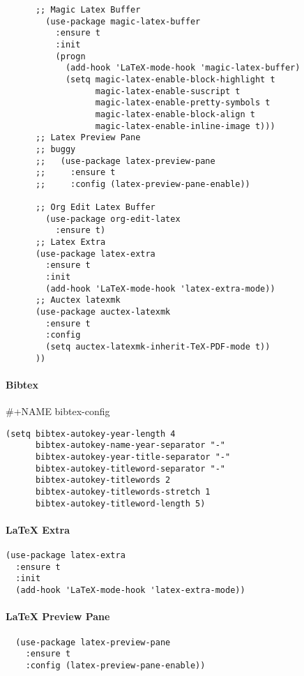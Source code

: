 \documentclass[11pt]{article}
\begin{document}
\begin{verbatim}
      ;; Magic Latex Buffer
        (use-package magic-latex-buffer
          :ensure t
          :init
          (progn
            (add-hook 'LaTeX-mode-hook 'magic-latex-buffer)
            (setq magic-latex-enable-block-highlight t
                  magic-latex-enable-suscript t
                  magic-latex-enable-pretty-symbols t
                  magic-latex-enable-block-align t
                  magic-latex-enable-inline-image t)))
      ;; Latex Preview Pane
      ;; buggy
      ;;   (use-package latex-preview-pane
      ;;     :ensure t
      ;;     :config (latex-preview-pane-enable))

      ;; Org Edit Latex Buffer
        (use-package org-edit-latex
          :ensure t)
      ;; Latex Extra
      (use-package latex-extra
        :ensure t
        :init
        (add-hook 'LaTeX-mode-hook 'latex-extra-mode))
      ;; Auctex latexmk
      (use-package auctex-latexmk
        :ensure t
        :config
        (setq auctex-latexmk-inherit-TeX-PDF-mode t))
      ))
\end{verbatim}

\paragraph*{Bibtex}
\label{sec:org631b0d7}

\#+NAME bibtex-config
\begin{verbatim}
(setq bibtex-autokey-year-length 4
      bibtex-autokey-name-year-separator "-"
      bibtex-autokey-year-title-separator "-"
      bibtex-autokey-titleword-separator "-"
      bibtex-autokey-titlewords 2
      bibtex-autokey-titlewords-stretch 1
      bibtex-autokey-titleword-length 5)
\end{verbatim}

\paragraph*{\LaTeX{} Extra}
\label{sec:org994070f}

\begin{verbatim}
(use-package latex-extra
  :ensure t
  :init
  (add-hook 'LaTeX-mode-hook 'latex-extra-mode))
\end{verbatim}

\paragraph*{\LaTeX{} Preview Pane}
\label{sec:org4b49acd}

\begin{verbatim}
  (use-package latex-preview-pane
    :ensure t
    :config (latex-preview-pane-enable))
\end{verbatim}
\end{document}
